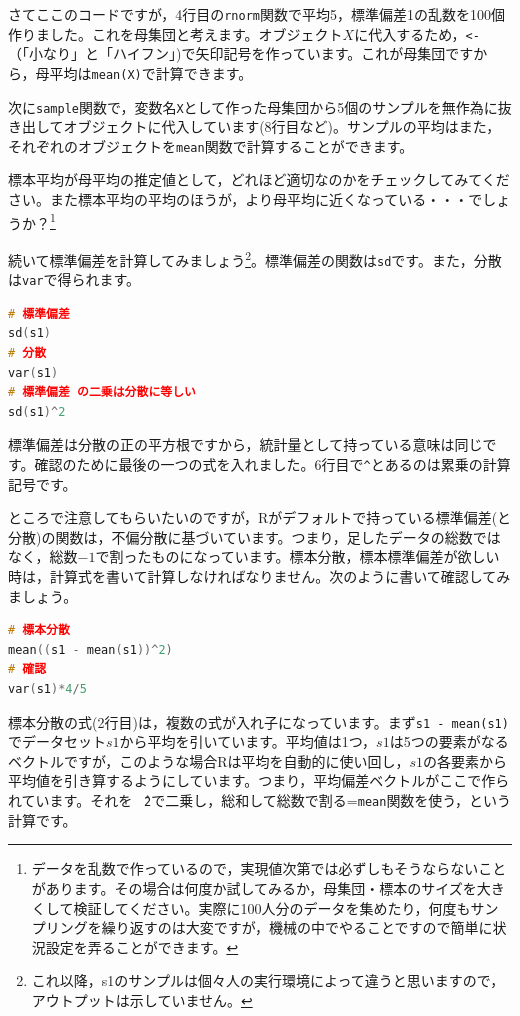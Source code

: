 \documentclass{ltjsbook}
\begin{document}
さてここのコードですが，4行目の\texttt{rnorm}関数で平均5，標準偏差1の乱数を100個作りました。これを母集団と考えます。オブジェクト$X$に代入するため，\verb|<-|（「小なり」と「ハイフン」)で矢印記号を作っています。これが母集団ですから，母平均は\texttt{mean(X)}で計算できます。

次に\texttt{sample}関数で，変数名\texttt{X}として作った母集団から5個のサンプルを無作為に抜き出してオブジェクトに代入しています(8行目など)。サンプルの平均はまた，それぞれのオブジェクトを\texttt{mean}関数で計算することができます。

標本平均が母平均の推定値として，どれほど適切なのかをチェックしてみてください。また標本平均の平均のほうが，より母平均に近くなっている・・・でしょうか？\footnote{データを乱数で作っているので，実現値次第では必ずしもそうならないことがあります。その場合は何度か試してみるか，母集団・標本のサイズを大きくして検証してください。実際に100人分のデータを集めたり，何度もサンプリングを繰り返すのは大変ですが，機械の中でやることですので簡単に状況設定を弄ることができます。}

続いて標準偏差を計算してみましょう\footnote{これ以降，s1のサンプルは個々人の実行環境によって違うと思いますので，アウトプットは示していません。}。標準偏差の関数は\texttt{sd}です。また，分散は\texttt{var}で得られます。
\begin{lstlisting}[language=c++]
# 標準偏差
sd(s1)
# 分散
var(s1)
# 標準偏差 の二乗は分散に等しい
sd(s1)^2
\end{lstlisting}
標準偏差は分散の正の平方根ですから，統計量として持っている意味は同じです。確認のために最後の一つの式を入れました。6行目で\texttt{\^}とあるのは累乗の計算記号です。

ところで注意してもらいたいのですが，Rがデフォルトで持っている標準偏差(と分散)の関数は，不偏分散に基づいています。つまり，足したデータの総数ではなく，総数$-1$で割ったものになっています。標本分散，標本標準偏差が欲しい時は，計算式を書いて計算しなければなりません。次のように書いて確認してみましょう。
\begin{lstlisting}[language=c++]
# 標本分散
mean((s1 - mean(s1))^2)
# 確認
var(s1)*4/5
\end{lstlisting}

標本分散の式(2行目)は，複数の式が入れ子になっています。まず\texttt{s1 - mean(s1)}でデータセット$s1$から平均を引いています。平均値は1つ，$s1$は5つの要素がなるベクトルですが，このような場合Rは平均を自動的に使い回し，$s1$の各要素から平均値を引き算するようにしています。つまり，平均偏差ベクトルがここで作られています。それを\texttt{\^　2}で二乗し，総和して総数で割る=\texttt{mean}関数を使う，という計算です。
\end{document}
